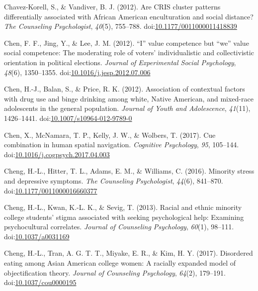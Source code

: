 \documentclass[english,man]{apa6}
\begin{document}
\hypertarget{ref-Chavez-Korell2012}{}
Chavez-Korell, S., \& Vandiver, B. J. (2012). Are CRIS cluster patterns
differentially associated with African American enculturation and social
distance? \emph{The Counseling Psychologist}, \emph{40}(5), 755--788.
doi:\href{https://doi.org/10.1177/0011000011418839}{10.1177/0011000011418839}

\hypertarget{ref-Chen2012a}{}
Chen, F. F., Jing, Y., \& Lee, J. M. (2012). ``I'' value competence but
``we'' value social competence: The moderating role of voters'
individualistic and collectivistic orientation in political elections.
\emph{Journal of Experimental Social Psychology}, \emph{48}(6),
1350--1355.
doi:\href{https://doi.org/10.1016/j.jesp.2012.07.006}{10.1016/j.jesp.2012.07.006}

\hypertarget{ref-Chen2012}{}
Chen, H.-J., Balan, S., \& Price, R. K. (2012). Association of
contextual factors with drug use and binge drinking among white, Native
American, and mixed-race adolescents in the general population.
\emph{Journal of Youth and Adolescence}, \emph{41}(11), 1426--1441.
doi:\href{https://doi.org/10.1007/s10964-012-9789-0}{10.1007/s10964-012-9789-0}

\hypertarget{ref-Chen2017}{}
Chen, X., McNamara, T. P., Kelly, J. W., \& Wolbers, T. (2017). Cue
combination in human spatial navigation. \emph{Cognitive Psychology},
\emph{95}, 105--144.
doi:\href{https://doi.org/10.1016/j.cogpsych.2017.04.003}{10.1016/j.cogpsych.2017.04.003}

\hypertarget{ref-Cheng2016}{}
Cheng, H.-L., Hitter, T. L., Adams, E. M., \& Williams, C. (2016).
Minority stress and depressive symptoms. \emph{The Counseling
Psychologist}, \emph{44}(6), 841--870.
doi:\href{https://doi.org/10.1177/0011000016660377}{10.1177/0011000016660377}

\hypertarget{ref-Cheng2013}{}
Cheng, H.-L., Kwan, K.-L. K., \& Sevig, T. (2013). Racial and ethnic
minority college students' stigma associated with seeking psychological
help: Examining psychocultural correlates. \emph{Journal of Counseling
Psychology}, \emph{60}(1), 98--111.
doi:\href{https://doi.org/10.1037/a0031169}{10.1037/a0031169}

\hypertarget{ref-Cheng2017}{}
Cheng, H.-L., Tran, A. G. T. T., Miyake, E. R., \& Kim, H. Y. (2017).
Disordered eating among Asian American college women: A racially
expanded model of objectification theory. \emph{Journal of Counseling
Psychology}, \emph{64}(2), 179--191.
doi:\href{https://doi.org/10.1037/cou0000195}{10.1037/cou0000195}
\end{document}

